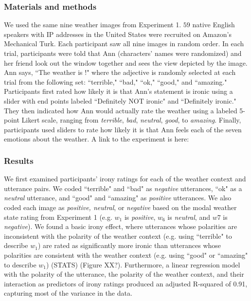\documentclass[10pt,letterpaper]{article}
\begin{document}
\subsubsection{Materials and methods}
We used the same nine weather images from Experiment 1. $59$ native English speakers with IP addresses in the United States were recruited on Amazon's Mechanical Turk. Each participant saw all nine images in random order. In each trial, participants were told that Ann (characters' names were randomized) and her friend look out the window together and sees the view depicted by the image. Ann says, ``The weather is \underline{\hspace{1cm}}!" where the adjective is randomly selected at each trial from the following set: ``terrible," ``bad," ``ok," ``good," and ``amazing." Participants first rated how likely it is that Ann's statement is ironic using a slider with end points labeled ``Definitely NOT ironic" and ``Definitely ironic." They then indicated how Ann would actually rate the weather using a labeled 5-point Likert scale, ranging from \emph{terrible}, \emph{bad}, \emph{neutral}, \emph{good}, to \emph{amazing}. Finally, participants used sliders to rate how likely it is that Ann feels each of the seven emotions about the weather. A link to the experiment is here:

\subsubsection{Results}
We first examined participants' irony ratings for each of the weather context and utterance pairs. We coded ``terrible" and ``bad" as \emph{negative} utterances, ``ok" as a \emph{neutral} utterance, and ``good" and ``amazing" as \emph{positive} utterances. We also coded each image as \emph{positive, neutral}, or \emph{negative} based on the modal weather state rating from Experiment 1 (e.g. $w_1$ is \emph{positive}, $w_6$ is \emph{neutral}, and $w7$ is \emph{negative}). We found a basic irony effect, where utterances whose polarities are inconsistent with the polarity of the weather context (e.g. using ``terrible" to describe $w_1$) are rated as significantly more ironic than utterances whose polarities are consistent with the weather context (e.g. using ``good" or ``amazing" to describe $w_1$) (STATS) (Figure XX?). Furthermore, a linear regression model with the polarity of the utterance, the polarity of the weather context, and their interaction as predictors of irony ratings produced an adjusted R-squared of 0.91, capturing most of the variance in the data. 
\end{document}
